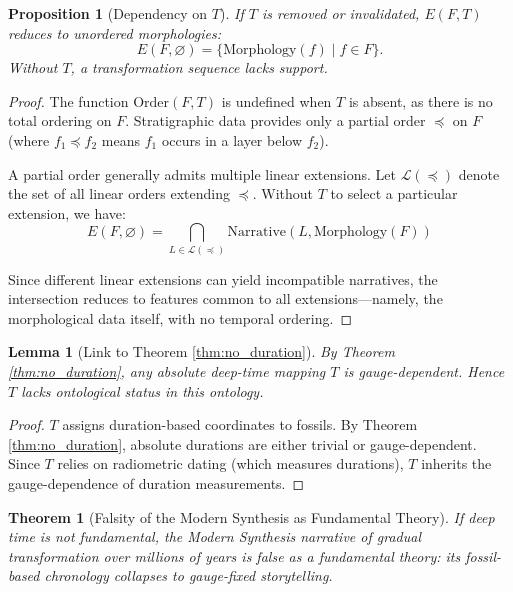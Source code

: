 \documentclass[11pt]{article}
\theoremstyle{definition}
\theoremstyle{plain}
\newtheorem{lemma}[definition]{Lemma}
\newtheorem{proposition}[definition]{Proposition}
\newtheorem{theorem}[definition]{Theorem}
\theoremstyle{remark}
\begin{document}
\begin{proposition}[Dependency on $T$]
If $T$ is removed or invalidated, $E(F,T)$ reduces to unordered morphologies:
\[
E(F,\varnothing) = \{ \text{Morphology}(f) \mid f\in F\}.
\]
Without $T$, a transformation sequence lacks support.
\end{proposition}

\begin{proof}
The function $\text{Order}(F,T)$ is undefined when $T$ is absent, as there is no total ordering on $F$. Stratigraphic data provides only a partial order $\preceq$ on $F$ (where $f_1 \preceq f_2$ means $f_1$ occurs in a layer below $f_2$). 

A partial order generally admits multiple linear extensions. Let $\mathcal{L}(\preceq)$ denote the set of all linear orders extending $\preceq$. Without $T$ to select a particular extension, we have:
$$E(F,\varnothing) = \bigcap_{L \in \mathcal{L}(\preceq)} \text{Narrative}(L, \text{Morphology}(F))$$

Since different linear extensions can yield incompatible narratives, the intersection reduces to features common to all extensions—namely, the morphological data itself, with no temporal ordering.
\end{proof}

\begin{lemma}[Link to Theorem \ref{thm:no_duration}]
By Theorem \ref{thm:no_duration}, any absolute deep-time mapping $T$ is gauge-dependent. Hence $T$ lacks ontological status in this ontology.
\end{lemma}

\begin{proof}
$T$ assigns duration-based coordinates to fossils. By Theorem \ref{thm:no_duration}, absolute durations are either trivial or gauge-dependent. Since $T$ relies on radiometric dating (which measures durations), $T$ inherits the gauge-dependence of duration measurements.
\end{proof}

\begin{theorem}[Falsity of the Modern Synthesis as Fundamental Theory]
If deep time is not fundamental, the Modern Synthesis narrative of gradual transformation over millions of years is false as a fundamental theory: its fossil-based chronology collapses to gauge-fixed storytelling.
\end{theorem}
\end{document}
